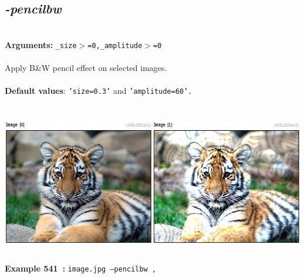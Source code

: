 \documentclass[a4paper,11pt,twoside]{book}
\begin{document}
\subsection{\emph{-pencilbw} }\vspace*{-0.5em}
~\\\textbf{Arguments: } 
{\small \texttt{\_size$>$=0,\_amplitude$>$=0}}\\~\\
Apply B\&W pencil effect on selected images.
~\\~\\\textbf{Default values}: {\small \texttt{'size=0.3'} and \texttt{'amplitude=60'.}}
\begin{center}\includegraphics[keepaspectratio=true,height=7cm,width=\textwidth]{img/gmic_def541.jpg}\\
{\footnotesize \textbf{Example 541~:} \texttt{image.jpg --pencilbw ,}}
\end{center}
\end{document}
